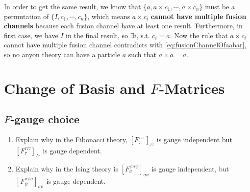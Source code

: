 \documentclass{book}
\begin{document}
In order to get the same result, we know that $\{a,a\times c_{1} ,\cdots ,a\times c_{n}\}$ must be a permutation of $\{I,c_{1} ,\cdots ,c_{n}\}$, which means $a\times c_{i}$ \textbf{cannot have multiple fusion channels} because each fusion channel have at least one result. Furthermore, in first case, we have $I$ in the final result, so $\exists i$, s.t. $c_{i} =\bar{a}$. Now the rule that $a\times c_{i}$ cannot have multiple fusion channel contradicts with \eqref{eq:fusionChannelOfaabar}, so no anyon theory can have a particle $a$ such that $a\times a=a$.

\chapter{Change of Basis and $F$-Matrices}

\section{$F$\textbf{-gauge choice}}

\begin{enumerate}
\item Explain why in the Fibonacci theory, $[F_{\tau }^{\tau \tau \tau } ]_{\tau \tau }$ is gauge independent but $[F_{\tau }^{\tau \tau \tau } ]_{I\tau }$ is gauge dependent.
\item Explain why in the Ising theory is $[F_{\sigma }^{\psi \sigma \psi } ]_{\sigma \sigma }$ is gauge independent, but $[F_{\psi }^{\sigma \psi \sigma } ]_{\sigma \sigma }$ is gauge dependent.
\end{enumerate}
\end{document}
